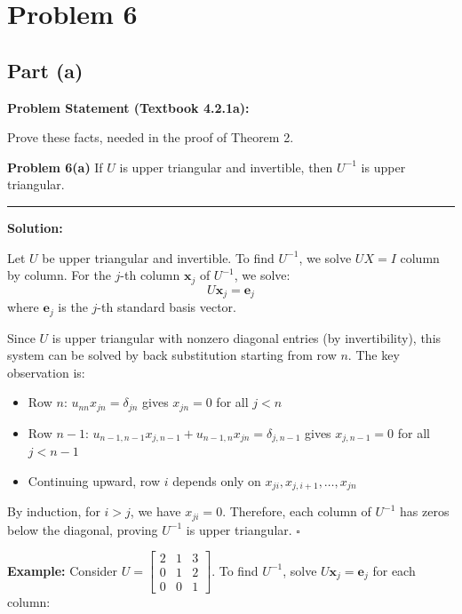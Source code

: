 \clearpage
\section*{Problem 6}

\subsection*{Part (a)}

\textbf{Problem Statement (Textbook 4.2.1a):} 

Prove these facts, needed in the proof of Theorem 2.

\textbf{\textbf{Problem 6(a)}} If $U$ is upper triangular and invertible, then $U^{-1}$ is upper triangular.

\noindent\rule{\textwidth}{0.4pt}

\vspace{1em}

\textbf{Solution:}

Let $U$ be upper triangular and invertible. To find $U^{-1}$, we solve $UX = I$ column by column. For the $j$-th column $\mathbf{x}_j$ of $U^{-1}$, we solve:
$$U\mathbf{x}_j = \mathbf{e}_j$$
where $\mathbf{e}_j$ is the $j$-th standard basis vector.

Since $U$ is upper triangular with nonzero diagonal entries (by invertibility), this system can be solved by back substitution starting from row $n$. The key observation is:
\begin{itemize}
    \item Row $n$: $u_{nn}x_{jn} = \delta_{jn}$ gives $x_{jn} = 0$ for all $j < n$
    \item Row $n-1$: $u_{n-1,n-1}x_{j,n-1} + u_{n-1,n}x_{jn} = \delta_{j,n-1}$ gives $x_{j,n-1} = 0$ for all $j < n-1$
    \item Continuing upward, row $i$ depends only on $x_{ji}, x_{j,i+1}, \ldots, x_{jn}$
\end{itemize}

By induction, for $i > j$, we have $x_{ji} = 0$. Therefore, each column of $U^{-1}$ has zeros below the diagonal, proving $U^{-1}$ is upper triangular. $\square$

\vspace{1em}

\textbf{Example:} Consider $U = \begin{bmatrix} 2 & 1 & 3 \\ 0 & 1 & 2 \\ 0 & 0 & 1 \end{bmatrix}$. To find $U^{-1}$, solve $U\mathbf{x}_j = \mathbf{e}_j$ for each column:


